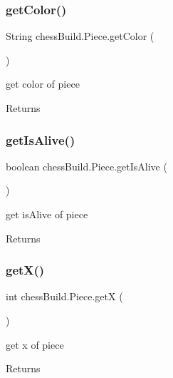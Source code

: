 \subsubsection{\texorpdfstring{get\+Color()}{getColor()}}
{\footnotesize\ttfamily String chess\+Build.\+Piece.\+get\+Color (\begin{DoxyParamCaption}{ }\end{DoxyParamCaption})}

get color of piece \begin{DoxyReturn}{Returns}

\end{DoxyReturn}
\mbox{\label{classchess_build_1_1_piece_a19f95de8f94f11b84a7e1b0a1261825c}} 
\subsubsection{\texorpdfstring{get\+Is\+Alive()}{getIsAlive()}}
{\footnotesize\ttfamily boolean chess\+Build.\+Piece.\+get\+Is\+Alive (\begin{DoxyParamCaption}{ }\end{DoxyParamCaption})}

get is\+Alive of piece \begin{DoxyReturn}{Returns}

\end{DoxyReturn}
\mbox{\label{classchess_build_1_1_piece_a5d9d98f556141604bbef630597474e42}} 
\subsubsection{\texorpdfstring{get\+X()}{getX()}}
{\footnotesize\ttfamily int chess\+Build.\+Piece.\+getX (\begin{DoxyParamCaption}{ }\end{DoxyParamCaption})}

get x of piece \begin{DoxyReturn}{Returns}

\end{DoxyReturn}
\mbox{\label{classchess_build_1_1_piece_a3c6c4ce7aec8f7c4e802aeee92aa7830}} 

